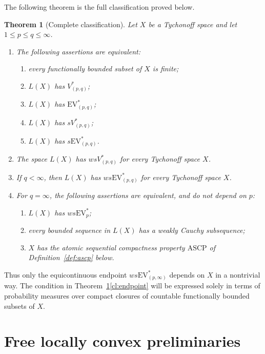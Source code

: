 \documentclass[11pt]{article}
\newtheorem{theorem}{Theorem}[section]
\newcommand{\EV}{\mathrm{EV}}
\newcommand{\ASCP}{\mathrm{ASCP}}
\begin{document}
The following theorem is the full classification proved below.

\begin{theorem}[Complete classification]\label{thm:classification}
Let $X$ be a Tychonoff space and let $1\leq p\leq q\leq\infty$.
\begin{enumerate}[label=\textup{(\Roman*)}]
\item\label{cl:strong}
The following assertions are equivalent:
\begin{enumerate}[label=\textup{(\alph*)}]
\item every functionally bounded subset of $X$ is finite;
\item $L(X)$ has $V^*_{(p,q)}$;
\item $L(X)$ has $\EV^*_{(p,q)}$;
\item $L(X)$ has $sV^*_{(p,q)}$;
\item $L(X)$ has $s\EV^*_{(p,q)}$.
\end{enumerate}
\item\label{cl:wsv}
The space $L(X)$ has $wsV^*_{(p,q)}$ for every Tychonoff space $X$.
\item\label{cl:wsevfinite}
If $q<\infty$, then $L(X)$ has $ws\EV^*_{(p,q)}$ for every Tychonoff space $X$.
\item\label{cl:endpoint}
For $q=\infty$, the following assertions are equivalent, and do not depend on
$p$:
\begin{enumerate}[label=\textup{(\alph*)}]
\item $L(X)$ has $ws\EV^*_p$;
\item every bounded sequence in $L(X)$ has a weakly Cauchy subsequence;
\item $X$ has the atomic sequential compactness property $\ASCP$ of
Definition~\ref{def:ascp} below.
\end{enumerate}
\end{enumerate}
\end{theorem}

Thus only the equicontinuous endpoint $ws\EV^*_{(p,\infty)}$ depends on $X$ in
a nontrivial way.  The condition in Theorem~\ref{thm:classification}\ref{cl:endpoint}
will be expressed solely in terms of probability measures over compact closures
of countable functionally bounded subsets of $X$.

\section{Free locally convex preliminaries}
\end{document}
